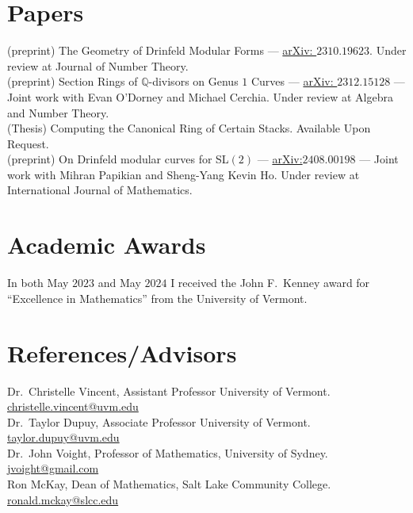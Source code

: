 \documentclass[letterpaper]{article}
\begin{document}
	\section*{Papers}

	\noindent (preprint) The Geometry of Drinfeld Modular Forms --- \href{https://arxiv.org/abs/2310.19623}{arXiv: $2310.19623$}. Under review at Journal of Number Theory.\\
	
	\noindent (preprint) Section Rings of $\mathbb{Q}$-divisors on Genus $1$ Curves --- \href{https://arxiv.org/abs/2312.15128}{arXiv: $2312.15128$} --- Joint work with Evan O'Dorney and Michael Cerchia. Under review at Algebra and Number Theory.\\
	
	\noindent (Thesis) Computing the Canonical Ring of Certain Stacks. Available Upon Request.\\
	
	\noindent (preprint) On Drinfeld modular curves for SL$(2)$ --- \href{https://arxiv.org/abs/2408.00198#}{arXiv:$2408.00198$} --- Joint work with Mihran Papikian and Sheng-Yang Kevin Ho. Under review at International Journal of Mathematics.

	
	\section*{Academic Awards}
	In both May $2023$ and May $2024$ I received the John F.\ Kenney award for ``Excellence in Mathematics'' from the University of Vermont. 
	
	\section*{References/Advisors}
	\noindent Dr.\ Christelle Vincent, Assistant Professor University of Vermont. \href{mailto:christelle.vincent@uvm.edu}{christelle.vincent@uvm.edu}\\
	\noindent Dr.\ Taylor Dupuy, Associate Professor University of Vermont. \href{mailto:taylor.dupuy@uvm.edu}{taylor.dupuy@uvm.edu}\\
	\noindent Dr.\ John Voight, Professor of Mathematics, University of Sydney.
	\href{mailto:jvoight@gmail.com}{jvoight@gmail.com}\\
	\noindent Ron McKay, Dean of Mathematics, Salt Lake Community College. \href{mailto:ronald.mckay@slcc.edu}{ronald.mckay@slcc.edu}
	
\end{document}

